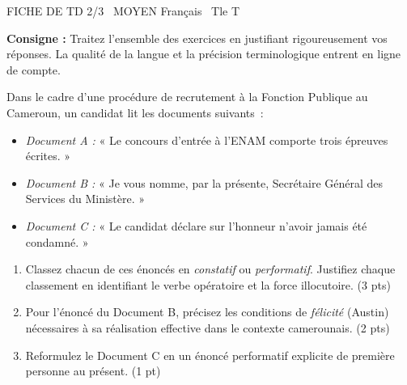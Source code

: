 \documentclass[11pt]{article}
\begin{document}
\begin{tcolorbox}[enhanced,colback=popink,colframe=popink,arc=10pt,boxrule=0pt,left=12pt,right=12pt,top=9pt,bottom=9pt]
{\color{white}\popxbold\small FICHE DE TD 2/3 \textbullet\ MOYEN \hfill Français \textbullet\ Tle T\par}
\end{tcolorbox}
\vspace{4pt}
\noindent\textbf{Consigne :} Traitez l'ensemble des exercices en justifiant rigoureusement vos réponses. La qualité de la langue et la précision terminologique entrent en ligne de compte.

\begin{exercice}
Dans le cadre d'une procédure de recrutement à la Fonction Publique au Cameroun, un candidat lit les documents suivants~:
\begin{itemize}
    \item \textit{Document A :} « Le concours d'entrée à l'ENAM comporte trois épreuves écrites. »
    \item \textit{Document B :} « Je vous nomme, par la présente, Secrétaire Général des Services du Ministère. »
    \item \textit{Document C :} « Le candidat déclare sur l'honneur n'avoir jamais été condamné. »
\end{itemize}
\begin{enumerate}
    \item Classez chacun de ces énoncés en \textit{constatif} ou \textit{performatif}. Justifiez chaque classement en identifiant le verbe opératoire et la force illocutoire. (3 pts)
    \item Pour l'énoncé du Document B, précisez les conditions de \textit{félicité} (Austin) nécessaires à sa réalisation effective dans le contexte camerounais. (2 pts)
    \item Reformulez le Document C en un énoncé performatif explicite de première personne au présent. (1 pt)
\end{enumerate}
\end{exercice}
\end{document}
